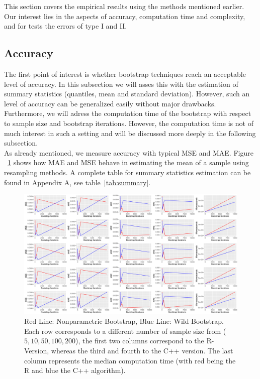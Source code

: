 This section covers the empirical results using the methods mentioned earlier. Our interest lies in the aspects of accuracy, computation time and complexity, and for tests the errors of type I and II. 
\subsection{Accuracy}
The first point of interest is whether bootstrap techniques reach an acceptable level of accuracy. In this subsection we will asses this with the estimation of summary statistics (quantiles, mean and standard deviation). However, such an level of accuracy can be generalized easily without major drawbacks. Furthermore, we will adress the computation time of the bootstrap with respect to sample size and bootstrap iterations. However, the computation time is not of much interest in such a setting and will be discussed more deeply in the following subsection. \\
As already mentioned, we measure accuracy with typical MSE and MAE. Figure ~\ref{fig:summary} shows how MAE and MSE behave in estimating the mean of a sample using resampling methods. A complete table for summary statistics estimation can be found in Appendix A, see table~\ref{tab:summary}. 

\begin{figure}\label{fig:summary}
	\includegraphics[scale=0.3]{./figures/plot_summary.pdf}
	\caption[Summary MSE and MAE]{Red Line: Nonparametric Bootstrap, Blue Line: Wild Bootstrap. Each row corresponds to a different number of sample size from ($5, 10, 50, 100, 200$), the first two columns correspond to the R-Version, whereas the third and fourth to the C++ version. The last column represents the median computation time (with red being the R and blue the C++ algorithm).}
\end{figure}

